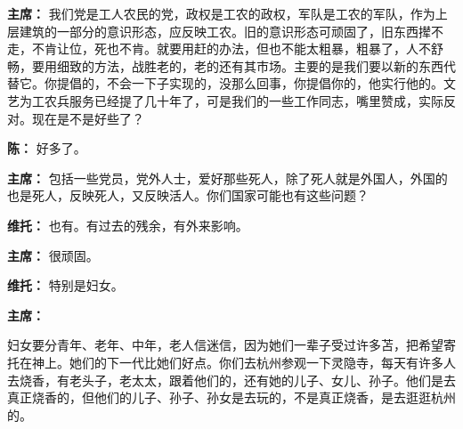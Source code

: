 \begin{list}{}
\item[\textbf{主席：}]{我们党是工人农民的党，政权是工农的政权，军队是工农的军队，作为上层建筑的一部分的意识形态，应反映工农。旧的意识形态可顽固了，旧东西撵不走，不肯让位，死也不肯。就要用赶的办法，但也不能太粗暴，粗暴了，人不舒畅，要用细致的方法，战胜老的，老的还有其市场。主要的是我们要以新的东西代替它。你提倡的，不会一下子实现的，没那么回事，你提倡你的，他实行他的。文艺为工农兵服务已经提了几十年了，可是我们的一些工作同志，嘴里赞成，实际反对。现在是不是好些了？}
\item[\textbf{陈：}]{好多了。}
\item[\textbf{主席：}]{包括一些党员，党外人士，爱好那些死人，除了死人就是外国人，外国的也是死人，反映死人，又反映活人。你们国家可能也有这些问题？}
\item[\textbf{维托：}]{也有。有过去的残余，有外来影响。}
\item[\textbf{主席：}]{很顽固。}
\item[\textbf{维托：}]{特别是妇女。}
\item[\textbf{主席：}]{妇女要分青年、老年、中年，老人信迷信，因为她们一辈子受过许多苫，把希望寄托在神上。她们的下一代比她们好点。你们去杭州参观一下灵隐寺，每天有许多人去烧香，有老头子，老太太，跟着他们的，还有她的儿子、女儿、孙子。他们是去真正烧香的，但他们的儿子、孙子、孙女是去玩的，不是真正烧香，是去逛逛杭州的。
    
}
\end{list}
